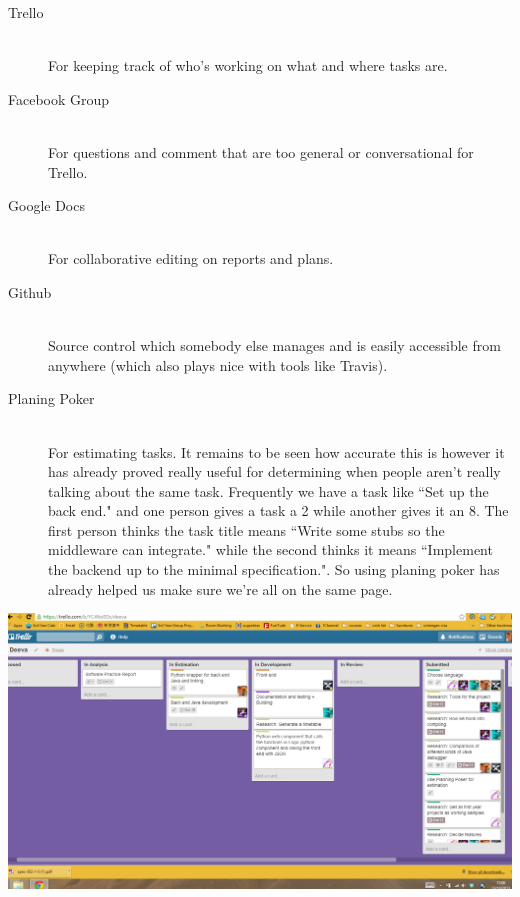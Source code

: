 \documentclass[11pt]{article}
\begin{document}
\begin{description}
  \item[Trello] \hfill \\
  For keeping track of who's working on what and where tasks are.
  \item[Facebook Group] \hfill \\
  For questions and comment that are too general or conversational for Trello.
  \item[Google Docs] \hfill \\
  For collaborative editing on reports and plans.
  \item[Github] \hfill \\
  Source control which somebody else manages and is easily accessible from anywhere
  (which also plays nice with tools like Travis).
  \item[Planing Poker] \hfill \\
  For estimating tasks. It remains to be seen how accurate this is however it has already proved really useful for determining when people aren't really talking about the same task. Frequently we have a task like ``Set up the back end." and one person gives a task a 2 while another gives it an 8. The first person thinks the task title means ``Write some stubs so the middleware can integrate." while the second thinks it means ``Implement the backend up to the minimal specification.". So using planing poker has already helped us make sure we're all on the same page.
\end{description}


\includegraphics[width=\textwidth]{TrelloBoard.png}
\end{document}
